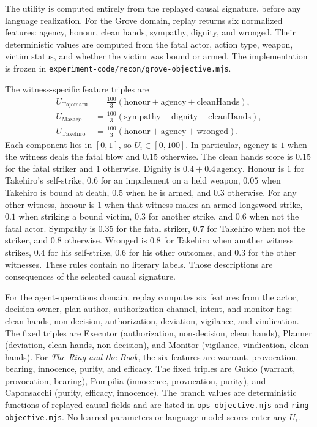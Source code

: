 \documentclass[10pt]{article}
\begin{document}
The utility is computed entirely from the replayed causal signature, before any
language realization. For the Grove domain, replay returns six normalized
features: agency, honour, clean hands, sympathy, dignity, and wronged. Their
deterministic values are computed from the fatal actor, action type, weapon,
victim status, and whether the victim was bound or armed. The implementation
is frozen in \texttt{experiment-code/recon/grove-objective.mjs}.

The witness-specific feature triples are
\[
\begin{aligned}
U_{\mathrm{Tajomaru}}&=\tfrac{100}{3}(\mathrm{honour}+\mathrm{agency}+\mathrm{cleanHands}),\\
U_{\mathrm{Masago}}&=\tfrac{100}{3}(\mathrm{sympathy}+\mathrm{dignity}+\mathrm{cleanHands}),\\
U_{\mathrm{Takehiro}}&=\tfrac{100}{3}(\mathrm{honour}+\mathrm{agency}+\mathrm{wronged}).
\end{aligned}
\]
Each component lies in $[0,1]$, so $U_i\in[0,100]$. In particular, agency is
$1$ when the witness deals the fatal blow and $0.15$ otherwise. The clean hands
score is $0.15$ for the fatal striker and $1$ otherwise. Dignity is
$0.4+0.4\,\mathrm{agency}$. Honour is $1$ for Takehiro's self-strike, $0.6$
for an impalement on a held weapon, $0.05$ when Takehiro is bound at death,
$0.5$ when he is armed, and $0.3$ otherwise. For any other witness, honour is
$1$ when that witness makes an armed longsword strike, $0.1$ when striking a
bound victim, $0.3$ for another strike, and $0.6$ when not the fatal actor.
Sympathy is $0.35$ for the fatal striker, $0.7$ for Takehiro when not the
striker, and $0.8$ otherwise. Wronged is $0.8$ for Takehiro when another
witness strikes, $0.4$ for his self-strike, $0.6$ for his other outcomes, and
$0.3$ for the other witnesses. These rules contain no literary labels. Those
descriptions are consequences of the selected causal signature.

For the agent-operations domain, replay computes six features from the actor,
decision owner, plan author, authorization channel, intent, and monitor flag:
clean hands, non-decision, authorization, deviation, vigilance, and
vindication. The fixed triples are
Executor (authorization, non-decision, clean hands), Planner (deviation,
clean hands, non-decision), and Monitor (vigilance, vindication, clean hands).
For \emph{The Ring and the Book}, the six features are warrant, provocation,
bearing, innocence, purity, and efficacy. The fixed triples are Guido (warrant,
provocation, bearing), Pompilia (innocence, provocation, purity), and
Caponsacchi (purity, efficacy, innocence). The branch values are
deterministic functions of replayed causal fields and are listed in
\texttt{ops-objective.mjs} and \texttt{ring-objective.mjs}. No learned
parameters or language-model scores enter any $U_i$.
\end{document}

